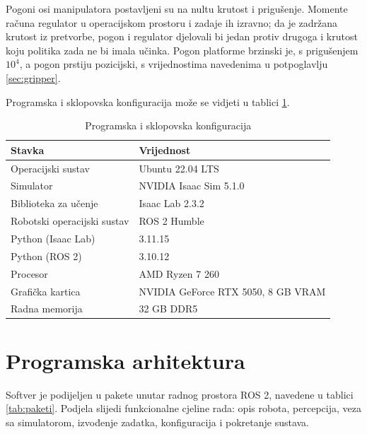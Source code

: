 Pogoni osi manipulatora postavljeni su na nultu krutost i prigušenje. Momente računa regulator
u operacijskom prostoru i zadaje ih izravno; da je zadržana krutost iz pretvorbe, pogon i
regulator djelovali bi jedan protiv drugoga i krutost koju politika zada ne bi imala učinka.
Pogon platforme brzinski je, s prigušenjem $10^4$, a pogon prstiju pozicijski, s vrijednostima
navedenima u potpoglavlju \ref{sec:gripper}.

Programska i sklopovska konfiguracija može se vidjeti u tablici \ref{tab:okruzenje}.

\begin{table}[H]
    \centering
    \caption{Programska i sklopovska konfiguracija}
    \label{tab:okruzenje}
    \begin{tabular}{@{}ll@{}}
        \toprule
        Stavka                      & Vrijednost                         \\
        \midrule
        Operacijski sustav          & Ubuntu 22.04 LTS                   \\
        Simulator                   & NVIDIA Isaac Sim 5.1.0             \\
        Biblioteka za učenje        & Isaac Lab 2.3.2                    \\
        Robotski operacijski sustav & ROS 2 Humble                       \\
        Python (Isaac Lab)          & 3.11.15                            \\
        Python (ROS 2)              & 3.10.12                            \\
        \midrule
        Procesor                    & AMD Ryzen 7 260                    \\
        Grafička kartica            & NVIDIA GeForce RTX 5050, 8 GB VRAM \\
        Radna memorija              & 32 GB DDR5                         \\
        \bottomrule
    \end{tabular}
\end{table}

\section{Programska arhitektura}
\label{sec:ros2}

Softver je podijeljen u pakete unutar radnog prostora ROS 2, navedene u tablici
\ref{tab:paketi}. Podjela slijedi funkcionalne cjeline rada: opis robota, percepcija, veza sa
simulatorom, izvođenje zadatka, konfiguracija i pokretanje sustava.

